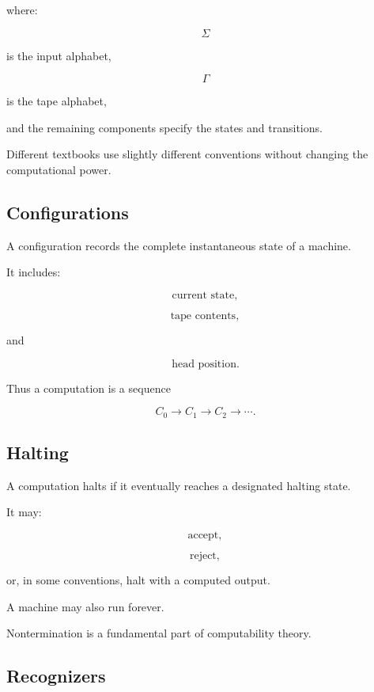 where:

\[
\Sigma
\]

is the input alphabet,

\[
\Gamma
\]

is the tape alphabet,

and the remaining components specify the states and transitions.

Different textbooks use slightly different conventions without changing
the computational power.

\subsection{Configurations}
\label{subsec:turing-configurations}

A configuration records the complete instantaneous state of a machine.

It includes:

\[
\boxed{
\text{current state},
}
\]

\[
\boxed{
\text{tape contents},
}
\]

and

\[
\boxed{
\text{head position}.
}
\]

Thus a computation is a sequence

\[
\boxed{
C_0
\rightarrow
C_1
\rightarrow
C_2
\rightarrow
\cdots.
}
\]

\subsection{Halting}
\label{subsec:turing-halting}

A computation halts if it eventually reaches a designated halting state.

It may:

\[
\boxed{
\text{accept},
}
\]

\[
\boxed{
\text{reject},
}
\]

or, in some conventions, halt with a computed output.

A machine may also run forever.

Nontermination is a fundamental part of computability theory.

\subsection{Recognizers}
\label{subsec:turing-recognizers}

